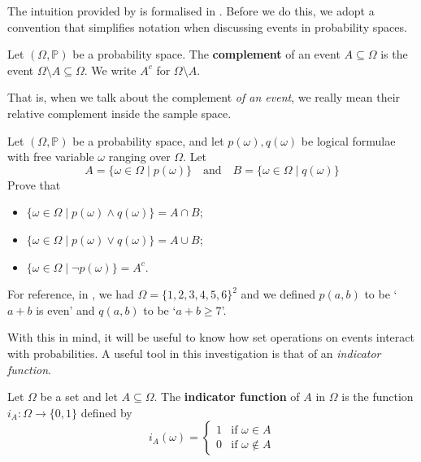 The intuition provided by  is formalised in . Before we do this, we adopt a convention that simplifies notation when discussing events in probability spaces.

\begin{definition}
\label{defComplementOfEvent}
Let $(\Omega,\mathbb{P})$ be a probability space. The \textbf{complement} of an event $A \subseteq \Omega$ is the event $\Omega \setminus A \subseteq \Omega$. We write $A^c$  for $\Omega \setminus A$.
\end{definition}

That is, when we talk about the complement \textit{of an event}, we really mean their relative complement inside the sample space.

\begin{exercise}
\label{exFormalOrAndNot}
Let $(\Omega, \mathbb{P})$ be a probability space, and let $p(\omega),q(\omega)$ be logical formulae with free variable $\omega$ ranging over $\Omega$. Let
\[ A = \{ \omega \in \Omega \mid p(\omega) \} \quad \text{and} \quad B = \{ \omega \in \Omega \mid q(\omega) \} \]
Prove that
\begin{itemize}
\item $\{ \omega \in \Omega \mid p(\omega) \wedge q(\omega) \} = A \cap B$;
\item $\{ \omega \in \Omega \mid p(\omega) \vee q(\omega) \} = A \cup B$;
\item $\{ \omega \in \Omega \mid \neg p(\omega) \} = A^c$.
\end{itemize}
For reference, in , we had $\Omega = \{ 1, 2, 3, 4, 5, 6 \}^2$ and we defined $p(a,b)$ to be `$a+b$ is even' and $q(a,b)$ to be `$a+b \ge 7$'.
\end{exercise}

With this in mind, it will be useful to know how set operations on events interact with probabilities. A useful tool in this investigation is that of an \textit{indicator function}.


\begin{definition}
\label{defIndicatorFunction}
Let $\Omega$ be a set and let $A \subseteq \Omega$. The \textbf{indicator function} of $A$ in $\Omega$ is the function $i_A : \Omega \to \{ 0,1 \}$ defined by
\[ i_A(\omega) = \begin{cases} 1 & \text{if } \omega \in A \\ 0 & \text{if } \omega \not \in A \end{cases} \]
\end{definition}

